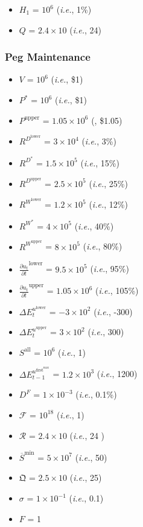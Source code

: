 \documentclass[class=article, crop=false]{standalone}
\begin{document}
\begin{itemize}[topsep=0pt, itemsep=3pt,leftmargin=16pt]
    \item $H_{1}$ = $10^{6}$ (\textit{i.e.}, 1\%)
    \item $Q$ = $2.4 \times 10$ (\textit{i.e.}, 24)
\end{itemize}


\subsubsection{Peg Maintenance}

\begin{itemize}[topsep=0pt, itemsep=3pt,leftmargin=16pt]
    \item $V$ = $10^{6}$ (\textit{i.e.}, \$1)
    \item $P^{*}$ = $10^{6}$ (\textit{i.e.}, \$1)
    \item $P^{\text{upper}}$ = $1.05 \times 10^{6}$ (, \$1.05)
    \item $R^{D^{\text{lower}}}$ = $3 \times 10^{4}$ (\textit{i.e.}, 3\%)
    \item $R^{D^{*}}$ = $1.5 \times 10^{5}$ (\textit{i.e.}, 15\%)
    \item $R^{D^{\text{upper}}}$ = $2.5 \times 10^{5}$ (\textit{i.e.}, 25\%)
    \item $R^{W^{\text{lower}}}$ = $1.2 \times 10^{5}$ (\textit{i.e.}, 12\%)
    \item $R^{W^{*}}$ = $4 \times 10^{5}$ (\textit{i.e.}, 40\%)
    \item $R^{W^{\text{upper}}}$ = $8 \times 10^{5}$ (\textit{i.e.}, 80\%)
    \item $\frac{\partial u_{t}}{\partial t}^{\text{lower}}$ = $9.5 \times 10^{5}$ (\textit{i.e.}, 95\%)
    \item $\frac{\partial u_{t}}{\partial t}^{\text{upper}}$ = $1.05 \times 10^{6}$ (\textit{i.e.}, 105\%)
    \item $\Delta E_{t}^{u^{\text{lower}}}$ = $-3 \times 10^{2}$ (\textit{i.e.}, -300)
    \item $\Delta E_{t}^{u^{\text{upper}}}$ = $3 \times 10^{2}$ (\textit{i.e.}, 300)
    \item $S^{\text{all}}$ = $10^{6}$ (\textit{i.e.}, 1)
    \item $\Delta E_{t-1}^{u^{\text{first}^{\text{max}}}}$ = $1.2 \times 10^{3}$ (\textit{i.e.}, 1200)
    \item $D^{F}$ = $1 \times 10^{-3}$ (\textit{i.e.}, 0.1\%)
    \item $\mathscr{F}$ = $10^{18}$ (\textit{i.e.}, 1)
    \item $\mathscr{R}$ = $2.4 \times 10$ (\textit{i.e.}, 24 )
    \item $\overline{S}^{\text{min}}$ = $5 \times 10^{7}$ (\textit{i.e.}, 50)
    \item $\mathfrak{Q}$ = $2.5 \times 10$ (\textit{i.e.}, 25)
    \item $\sigma$ = $1 \times 10^{-1}$ (\textit{i.e.}, 0.1)
    \item $F$ = 1
\end{itemize}
\end{document}
